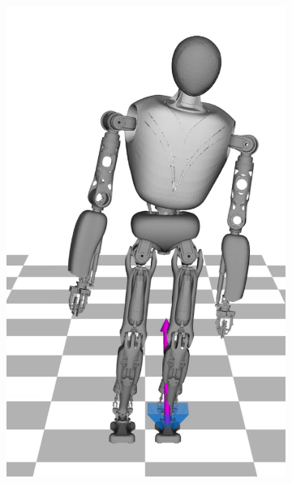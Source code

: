 \begin{figure}
\begin{subfigure}{.16\textwidth}
	\includegraphics[width=.95\linewidth]{fig/walkStatic/snaps/2}
	\caption{}
\end{subfigure}%
\begin{subfigure}{.16\textwidth}

\end{subfigure}
\end{figure}
